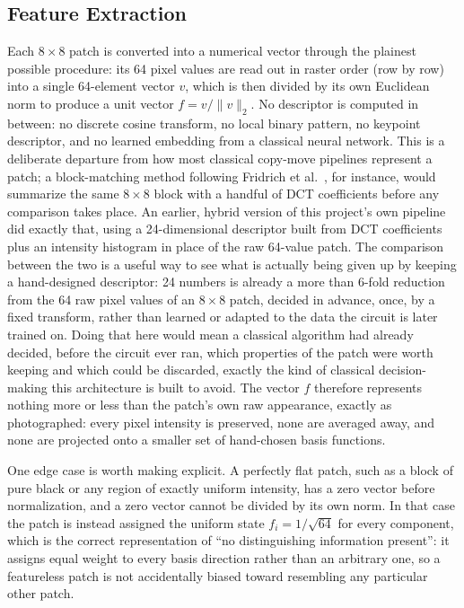 \documentclass[conference]{IEEEtran}
\begin{document}
\subsection{Feature Extraction}\label{sec:features}
Each $8\times8$ patch is converted into a numerical vector through the plainest possible procedure: its 64 pixel values are read out in raster order (row by row) into a single 64-element vector $v$, which is then divided by its own Euclidean norm to produce a unit vector $f = v/\|v\|_2$. No descriptor is computed in between: no discrete cosine transform, no local binary pattern, no keypoint descriptor, and no learned embedding from a classical neural network. This is a deliberate departure from how most classical copy-move pipelines represent a patch; a block-matching method following Fridrich et al.~\cite{fridrich2003}, for instance, would summarize the same $8\times8$ block with a handful of DCT coefficients before any comparison takes place. An earlier, hybrid version of this project's own pipeline did exactly that, using a 24-dimensional descriptor built from DCT coefficients plus an intensity histogram in place of the raw 64-value patch. The comparison between the two is a useful way to see what is actually being given up by keeping a hand-designed descriptor: 24 numbers is already a more than 6-fold reduction from the 64 raw pixel values of an $8\times8$ patch, decided in advance, once, by a fixed transform, rather than learned or adapted to the data the circuit is later trained on. Doing that here would mean a classical algorithm had already decided, before the circuit ever ran, which properties of the patch were worth keeping and which could be discarded, exactly the kind of classical decision-making this architecture is built to avoid. The vector $f$ therefore represents nothing more or less than the patch's own raw appearance, exactly as photographed: every pixel intensity is preserved, none are averaged away, and none are projected onto a smaller set of hand-chosen basis functions.

One edge case is worth making explicit. A perfectly flat patch, such as a block of pure black or any region of exactly uniform intensity, has a zero vector before normalization, and a zero vector cannot be divided by its own norm. In that case the patch is instead assigned the uniform state $f_i = 1/\sqrt{64}$ for every component, which is the correct representation of ``no distinguishing information present'': it assigns equal weight to every basis direction rather than an arbitrary one, so a featureless patch is not accidentally biased toward resembling any particular other patch.
\end{document}
